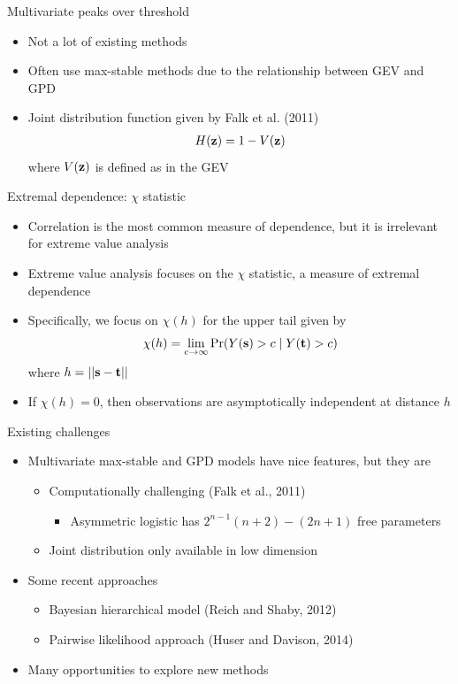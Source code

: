 \documentclass{beamer}
\begin{document}
\begin{frame}{Multivariate peaks over threshold}
  \begin{itemize}
    \item Not a lot of existing methods
    \item Often use max-stable methods due to the relationship between GEV and GPD
    \item Joint distribution function given by Falk et al. (2011)
    \begin{align*}
      H(\mbox{\bf z}) = 1 - V(\mbox{\bf z})
    \end{align*}
    where $V(\mbox{\bf z})$ is defined as in the GEV
  \end{itemize}
\end{frame}

\begin{frame}{Extremal dependence: $\chi$ statistic}
  \begin{itemize} \setlength{\itemsep}{0.5em}
    \item Correlation is the most common measure of dependence, but it is irrelevant for extreme value analysis
    \item Extreme value analysis focuses on the $\chi$ statistic, a measure of extremal dependence
    \item Specifically, we focus on $\chi(h)$ for the upper tail given by
    \begin{align*}
      \chi(h) = \lim_{c \rightarrow \infty}\Pr(Y(\mbox{\bf s}) > c \mid Y(\mbox{\bf t}) > c)
    \end{align*}
    where $h = ||\mbox{\bf s} - \mbox{\bf t}||$
    \item If $ \chi(h) = 0$, then observations are asymptotically independent at distance $h$
  \end{itemize}
\end{frame}

\begin{frame}{Existing challenges}
  \begin{itemize} \setlength{\itemsep}{0.5em}
    \item Multivariate max-stable and GPD models have nice features, but they are
    \begin{itemize}
      \item Computationally challenging (Falk et al., 2011)
      \begin{itemize}
        \item Asymmetric logistic has $2^{n-1}(n + 2) - (2n + 1)$ free parameters
      \end{itemize}
      \item Joint distribution only available in low dimension
    \end{itemize}
    \item Some recent approaches
    \begin{itemize}
      \item Bayesian hierarchical model (Reich and Shaby, 2012)
      \item Pairwise likelihood approach (Huser and Davison, 2014)
    \end{itemize}
    \item Many opportunities to explore new methods
  \end{itemize}
\end{frame}
\end{document}
